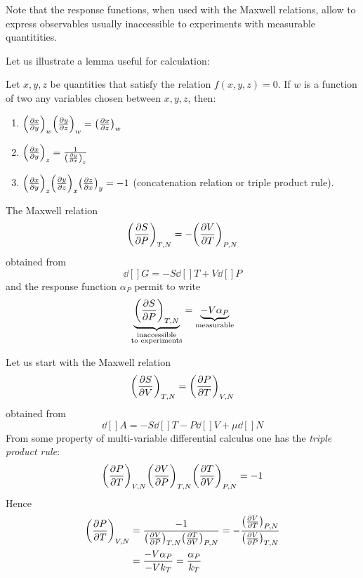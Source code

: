 \documentclass[../main/main.tex]{subfiles}
\begin{document}
Note that the response functions, when used with the Maxwell relations, allow to express observables usually inaccessible to experiments with measurable quantitities.

Let us illustrate a lemma useful for calculation:

\begin{lemma}
  \label{th:2_1}
Let \(x,y,z  \)  be quantities that satisfy the relation \( f(x,y,z)=0 \). If \( w \)  is a function of  two any variables chosen between  \(x,y,z  \), then:
\begin{enumerate}
\item \( \qty(\pdv{x}{y} )_w \qty(\pdv{y}{z} )_w = \qty(\pdv{x}{z} )_w   \)
\item \( \qty(\pdv{x}{y} )_z = \frac{1}{\qty(\pdv{y}{x} )_z }  \)
\item \( \qty(\pdv{x}{y} )_z \qty(\pdv{y}{z} )_x  \qty(\pdv{z}{x} )_y = -1    \)  (concatenation relation or triple product rule).
\end{enumerate}
\end{lemma}

\begin{example}
  The Maxwell relation
  \begin{equation*}
    \qty(\pdv{S}{P} )_{T,N} = - \qty(\pdv{V}{T} )_{P,N}
  \end{equation*}
  obtained from
  \begin{equation*}
\dd[]{G} = - S \dd[]{T} + V \dd[]{P}
  \end{equation*}
and the response function \( \alpha _P \) permit to write
\begin{equation}
  \underbrace{\qty(\pdv{S}{P} )_{T,N}}_{\substack{ \text{inaccessible} \\  \text{to experiments} } }  = \underbrace{- V \alpha _P}_{\text{measurable}}
  \label{eq:}
\end{equation}
\end{example}
\begin{example}
Let us start with the Maxwell relation
\begin{equation*}
  \qty(\pdv{S}{V} )_{T,N} =  \qty(\pdv{P}{T} )_{V,N}
\end{equation*}
obtained from
\begin{equation*}
    \dd[]{A} = - S \dd[]{T} - P \dd[]{V} + \mu \dd[]{N}
\end{equation*}
From some property of multi-variable differential calculus one has the \textit{triple product rule}:
\begin{equation}
    \qty(\pdv{P}{T} )_{V,N}  \qty(\pdv{V}{P} )_{T,N}   \qty(\pdv{T}{V} )_{P,N} =-1
  \label{eq:}
\end{equation}
Hence
\begin{equation}
\begin{split}
    \qty(\pdv{P}{T} )_{V,N} &= \frac{-1}{ \qty(\pdv{V}{P} )_{T,N}   \qty(\pdv{T}{V} )_{P,N} }  = - \frac{  \qty(\pdv{V}{T} )_{P,N} }{   \qty(\pdv{V}{P} )_{T,N} } \\
    &= \frac{-V \alpha _P}{-V k_T} = \frac{\alpha _P}{k _T}
\end{split}
  \label{eq:}
\end{equation}
\end{example}
\end{document}

